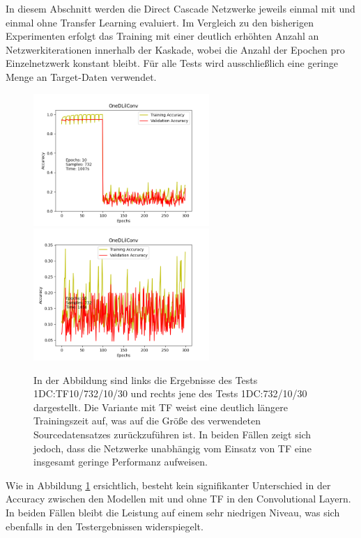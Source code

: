 In diesem Abschnitt werden die Direct Cascade Netzwerke jeweils einmal mit und einmal ohne Transfer Learning evaluiert. Im Vergleich zu den 
bisherigen Experimenten erfolgt das Training mit einer deutlich erhöhten Anzahl an Netzwerkiterationen innerhalb der Kaskade, wobei die Anzahl der 
Epochen pro Einzelnetzwerk konstant bleibt. Für alle Tests wird ausschließlich eine geringe Menge an Target-Daten verwendet.

\begin{figure}[htpb]
    \includegraphics[height=5cm]{../../Plots/ba_plots/classTF/1dc_tr.png}
    \includegraphics[height=5cm]{../../Plots/ba_plots/classTF/wo1dc_tr.png}
    \caption{\label{fig:1dc_tr} 
    \small{In der Abbildung sind links die Ergebnisse des Tests 1DC:TF10/732/10/30 und rechts jene des Tests 1DC:732/10/30 dargestellt. Die 
    Variante mit TF weist eine deutlich längere Trainingszeit auf, was auf die Größe des verwendeten Sourcedatensatzes zurückzuführen ist. In 
    beiden Fällen zeigt sich jedoch, dass die Netzwerke unabhängig vom Einsatz von TF eine insgesamt geringe Performanz aufweisen.}}
\end{figure}

Wie in Abbildung \ref{fig:1dc_tr} ersichtlich, besteht kein signifikanter Unterschied in der Accuracy zwischen den 
Modellen mit und ohne TF in den Convolutional Layern. In beiden Fällen bleibt die Leistung auf einem sehr niedrigen Niveau, was 
sich ebenfalls in den Testergebnissen widerspiegelt.

